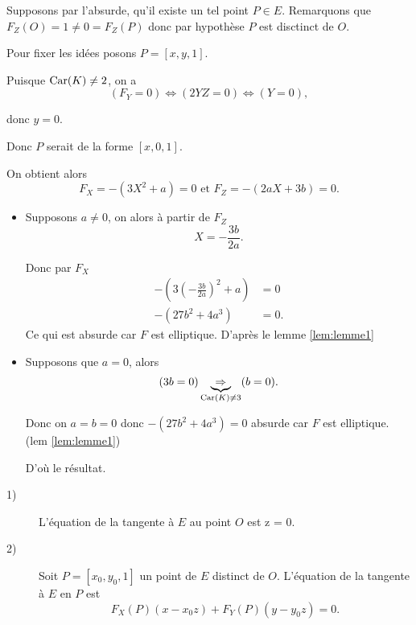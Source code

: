\begin{demonstration}
   Supposons par l'absurde, qu'il existe un tel point $P \in E$. Remarquons que $F_{Z}(O) = 1 \neq 0 = F_{Z}(P)$ donc par hypothèse $P$ est disctinct de $O$.

   Pour fixer les idées posons $P = [x,y,1]$.

   Puisque $\operatorname{Car}(K) \neq 2$, on a
   \[
       (F_{Y} = 0) \iff (2YZ = 0) \iff (Y = 0) 
   ,\] 

   donc $y = 0$.
   
   Donc $P$ serait de la forme $[x,0,1]$.
   
   On obtient alors
   \[
   F_{X} = - \left( 3X^2 + a \right) = 0 \text{ et } F_{Z} = -\left( 2aX + 3b \right) = 0
   .\] 
   
   \begin{itemize}
       \item Supposons $a \neq 0$, on alors à partir de $F_{Z}$
   \[
       X = - \frac{3b}{2a} 
   .\] 

   Donc par $F_{X}$
\begin{align*}
    - \left( 3 (- \frac{3b}{2a})^2 + a \right) &= 0 \\
    - \left( 27b^2 + 4a^3 \right) &= 0
.\end{align*}
Ce qui est absurde car $F$ est elliptique. D'après le lemme \ref{lem:lemme1}
        \item Supposons que $a = 0$, alors
            \[
                (3b = 0) \underbrace{\Rightarrow}_{\operatorname{Car}(K) \neq 3} (b = 0)
            .\] 

            Donc on $a = b = 0$ donc $-\left( 27b^2 + 4a^3 \right) = 0$ absurde car $F$ est elliptique. (lem \ref{lem:lemme1})

            D'où le résultat.
   \end{itemize}
\end{demonstration}


\begin{lemme}
    \label{lem:lemme4}
    
    \begin{description}
        \item[1)] L'équation de la tangente à $E$ au point $O$ est z = 0.
        \item[2)] Soit $P = \left[ x_0, y_0, 1 \right]$ un point de $E$ distinct de $O$. L'équation de la tangente à $E$ en $P$ est
            \[
            F_{X}(P)\left( x - x_0z \right) + F_{Y}(P)\left( y - y_0z \right) = 0
            .\] 
    \end{description}
\end{lemme}

